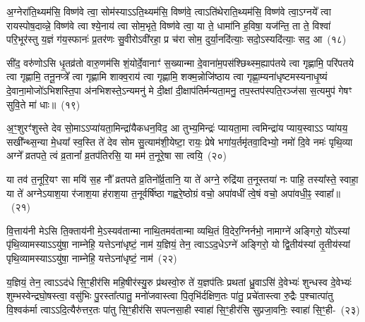 {\anuvakamend[{मि॒त्रस्य॒ त्रयो॑विꣳशतिश्च}]}

अ॒ग्नेरा॑ति॒थ्यम॑सि॒ विष्ण॑वे त्वा॒ सोम॑स्या\-ऽऽ\-ति॒थ्यम॑सि॒ विष्ण॑वे॒ त्वा\-ऽति॑थेराति॒थ्यम॑सि॒ विष्ण॑वे त्वा॒\-ऽग्नये᳚ त्वा रायस्पोष॒दाव्न्ने॒ विष्ण॑वे त्वा श्ये॒नाय॑ त्वा सोम॒भृते॒ विष्ण॑वे त्वा॒ या ते॒ धामा॑नि ह॒विषा॒ यज॑न्ति॒ ता ते॒ विश्वा॑ परि॒भूर॑स्तु य॒ज्ञं ग॑य॒स्फानः॑ प्र॒तर॑णः सु॒वीरो\-ऽवी॑रहा॒ प्र च॑रा सोम॒ दुर्या॒नदि॑त्याः॒ सदो॒\-ऽस्यदि॑त्याः॒ सद॒ आ~(१८)\ip

सी॑द॒ वरु॑णो\-ऽसि धृ॒तव्र॑तो वारु॒णम॑सि शं॒योर्दे॒वानाꣳ॑ स॒ख्यान्मा दे॒वाना॑म॒प\-स॑श्छिथ्स्म॒\-ह्याप॑तये त्वा गृह्णामि॒ परि॑पतये त्वा गृह्णामि॒ तनू॒नप्त्रे᳚ त्वा गृह्णामि शाक्व॒राय॑ त्वा गृह्णामि॒ शक्म॒न्नोजि॑ष्ठाय त्वा गृह्णा॒म्यना॑धृष्टम\-स्यनाधृ॒ष्यं दे॒वाना॒मोजो॑\-ऽभिशस्ति॒पा अ॑नभिशस्ते॒\-ऽन्यमनु॑ मे दी॒क्षां दी॒क्षाप॑तिर्मन्यता॒मनु॒ तप॒स्तप॑स्पति॒रञ्ज॑सा स॒त्यमुप॑ गेषꣳ सुवि॒ते मा॑ धाः॥~(१९)\ip

{\anuvakamend[{आ मैकं॑ च}]}%

अ॒ꣳ॒शुरꣳ॑शुस्ते देव सो॒मा\-ऽऽ\-प्या॑यता॒मिन्द्रा॑यैकधन॒विद॒ आ तुभ्य॒मिन्द्रः॑ प्यायता॒मा त्वमिन्द्रा॑य प्याय॒स्वा\-ऽऽ प्या॑यय॒ सखी᳚न्थ्स॒न्या मे॒धया᳚ स्व॒स्ति ते॑ देव सोम सु॒त्याम॑शी॒येष्टा॒ रायः॒ प्रेषे भगा॑य॒र्तमृ॑तवा॒दिभ्यो॒ नमो॑ दि॒वे नमः॑ पृथि॒व्या अग्ने᳚ व्रतपते॒ त्वं व्र॒तानां᳚ व्र॒तप॑तिरसि॒ या मम॑ त॒नूरे॒षा सा त्वयि॒~(२०)\ip

या तव॑ त॒नूरि॒यꣳ सा मयि॑ स॒ह नौ᳚ व्रतपते व्र॒तिनो᳚र्व्र॒तानि॒ या ते॑ अग्ने॒ रुद्रि॑या त॒नूस्तया॑ नः पाहि॒ तस्या᳚स्ते॒ स्वाहा॒ या ते॑ अग्ने\-ऽयाश॒या र॑जाश॒या ह॑राश॒या त॒नूर्वर्\mbox{}षि॑ष्ठा गह्वरे॒ष्ठोग्रं वचो॒ अपा॑वधीं त्वे॒षं वचो॒ अपा॑वधी॒ꣴ॒ स्वाहा᳚॥~(२१)\ip

{\anuvakamend[{त्वयि॑ चत्वारि॒ꣳ॒शच्च॑}]}%

वि॒त्ताय॑नी मे\-ऽसि ति॒क्ताय॑नी मे॒\-ऽस्यव॑तान्मा नाथि॒तमव॑तान्मा व्यथि॒तं वि॒देर॒ग्निर्नभो॒ नामाग्ने॑ अङ्गिरो॒ यो᳚\-ऽस्यां पृ॑थि॒व्यामस्या\-ऽऽ\-यु॑षा॒ नाम्नेहि॒ यत्ते\-ऽना॑धृष्टं॒ नाम॑ य॒ज्ञियं॒ तेन॒ त्वा\-ऽऽ\-द॒धे\-ऽग्ने॑ अङ्गिरो॒ यो द्वि॒तीय॑स्यां तृ॒तीय॑स्यां पृथि॒व्यामस्या\-ऽऽ\-यु॑षा॒ नाम्नेहि॒ यत्ते\-ऽना॑धृष्टं॒ नाम॑~(२२)\ip

य॒ज्ञियं॒ तेन॒ त्वा\-ऽऽ\-द॑धे सि॒ꣳ॒हीर॑सि महि॒षीर॑स्यु॒रु प्र॑थस्वो॒रु ते॑ य॒ज्ञप॑तिः प्रथतां ध्रु॒वा\-ऽसि॑ दे॒वेभ्यः॑ शुन्धस्व दे॒वेभ्यः॑ शुम्भस्वेन्द्रघो॒षस्त्वा॒ वसु॑भिः पु॒रस्ता᳚त्पातु॒ मनो॑जवास्त्वा पि॒तृभि॑र्दक्षिण॒तः पा॑तु॒ प्रचे॑तास्त्वा रु॒द्रैः प॒श्चात्पा॑तु वि॒श्वक॑र्मा त्वा\-ऽऽ\-दि॒त्यैरु॑त्तर॒तः पा॑तु सि॒ꣳ॒हीर॑सि सपत्नसा॒ही स्वाहा॑ सि॒ꣳ॒हीर॑सि सुप्रजा॒वनिः॒ स्वाहा॑ सि॒ꣳ॒ही-~(२३)\ip


